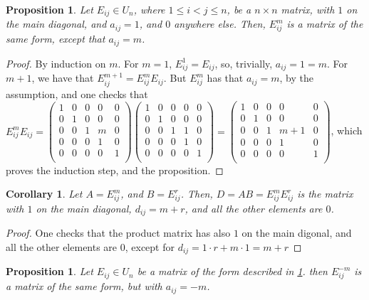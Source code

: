 \documentclass[12pt]{article}
\newtheorem{proposition}[theorem]{Proposition}
\newtheorem{corollary}[theorem]{Corollary}
\begin{document}
\begin{proposition}
\label{prop.unipotent.matrix.integer.addition}
Let $E_{ij}\in U_n$, where $1\leq i<j\leq n$, be a $n\times n$ matrix, with $1$ on the main diagonal, and $a_{ij}=1$, and $0$ anywhere else. Then, $E_{ij}^m$ is a matrix of the same form, except that $a_{ij}=m$.
\end{proposition}
\begin{proof}
By induction on $m$. For $m=1$, $E_{ij}^1=E_{ij}$, so, trivially, $a_{ij}=1=m$.
For $m+1$, we have that $E_{ij}^{m+1}=E_{ij}^mE_{ij}$. But $E_{ij}^m$ has that $a_{ij}=m$, by the assumption, and one checks that $E_{ij}^mE_{ij}=\begin{pmatrix}
1 & 0 & 0 & 0 & 0\\
0 & 1 & 0 & 0 & 0\\
0 & 0 & 1 & m & 0\\
0 & 0 & 0 & 1 & 0\\
0 & 0 & 0 & 0 & 1\\
\end{pmatrix}\begin{pmatrix}
1 & 0 & 0 & 0 & 0\\
0 & 1 & 0 & 0 & 0\\
0 & 0 & 1 & 1 & 0\\
0 & 0 & 0 & 1 & 0\\
0 & 0 & 0 & 0 & 1\\
\end{pmatrix}=\begin{pmatrix}
1 & 0 & 0 & 0 & 0\\
0 & 1 & 0 & 0 & 0\\
0 & 0 & 1 & m+1 & 0\\
0 & 0 & 0 & 1 & 0\\
0 & 0 & 0 & 0 & 1\\
\end{pmatrix}$, which proves the induction step, and the proposition.
\end{proof}
\begin{corollary}
\label{cor.unipotent.matrix.integer.addition}
Let $A=E_{ij}^m$, and $B=E_{ij}^r$. Then, $D=AB=E_{ij}^mE_{ij}^r$ is the matrix with $1$ on the main diagonal, $d_{ij}=m+r$, and all the other elements are $0$.
\end{corollary}
\begin{proof}
One checks that the product matrix has also $1$ on the main digonal, and all the other elements are $0$, except for $d_{ij}=1\cdot r+m\cdot 1=m+r$
\end{proof}
\begin{proposition}
\label{prop.unipotent.matrix.integer.inverse}
Let $E_{ij}\in U_n$ be a matrix of the form described in \ref{prop.unipotent.matrix.integer.addition}. then $E_{ij}^{-m}$ is a matrix of the same form, but with $a_{ij}=-m$.
\end{proposition}
\end{document}
